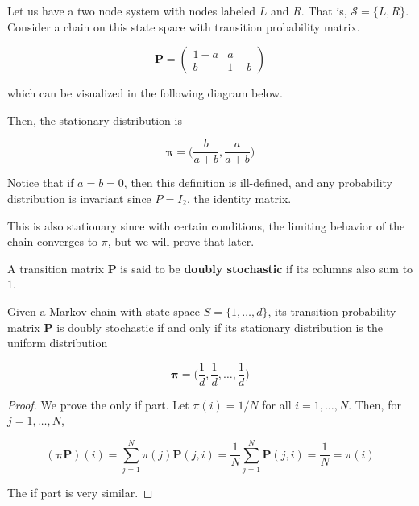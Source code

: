 \documentclass{article}
\begin{document}
    \begin{example}
      Let us have a two node system with nodes labeled $L$ and $R$. That is, $\mathcal{S} = \{L, R\}$. Consider a chain on this state space with transition probability matrix. 

        \[\mathbf{P} = \begin{pmatrix}
        1-a & a \\ b & 1-b 
        \end{pmatrix}\]

      which can be visualized in the following diagram below.

      \begin{center}
      \end{center}

      Then, the stationary distribution is 

        \[\boldsymbol{\pi} = \Big( \frac{b}{a+b}, \frac{a}{a+b} \Big)\]

      Notice that if $a = b = 0$, then this definition is ill-defined, and any probability distribution is invariant since $P = I_2$, the identity matrix. 
    \end{example}

    This is also stationary since with certain conditions, the limiting behavior of the chain converges to $\pi$, but we will prove that later. 

    \begin{definition}
      A transition matrix $\mathbf{P}$ is said to be \textbf{doubly stochastic} if its columns also sum to $1$. 
    \end{definition}

    \begin{theorem}
      Given a Markov chain with state space $S = \{1, \ldots, d\}$, its transition probability matrix $\mathbf{P}$ is doubly stochastic if and only if its stationary distribution is the uniform distribution 

        \[\boldsymbol{\pi} = \bigg( \frac{1}{d}, \frac{1}{d}, \ldots, \frac{1}{d} \bigg)\]
    \end{theorem}
    \begin{proof}
      We prove the only if part. Let $\pi(i) = 1/N$ for all $i = 1, \ldots, N$. Then, for $j = 1, \ldots, N$, 

        \[(\boldsymbol{\pi} \mathbf{P}) (i) = \sum_{j=1}^N \pi(j) \mathbf{P}(j, i) = \frac{1}{N} \sum_{j=1}^N \mathbf{P}(j, i) = \frac{1}{N} = \pi(i) \]

      The if part is very similar. 
    \end{proof}
\end{document}

